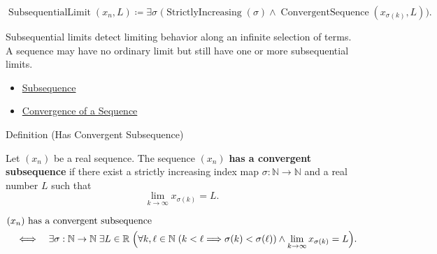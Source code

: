 \begin{remark*}
\[
\operatorname{SubsequentialLimit}(x_n,L)
\coloneqq
\exists \sigma\;
\bigl(
  \operatorname{StrictlyIncreasing}(\sigma)
  \land
  \operatorname{ConvergentSequence}(x_{\sigma(k)},L)
\bigr).
\]
\end{remark*}

\begin{remark*}[Interpretation]
Subsequential limits detect limiting behavior along an infinite selection of
terms. A sequence may have no ordinary limit but still have one or more
subsequential limits.
\end{remark*}

\begin{dependencies}
\begin{itemize}
  \item \hyperref[def:subsequence]{Subsequence}
  \item \hyperref[def:convergent-sequence]{Convergence of a Sequence}
\end{itemize}
\end{dependencies}


\begin{definitionbox}{Definition (Has Convergent Subsequence)}
\begin{definition}
\label{def:has-convergent-subsequence}
Let $(x_n)$ be a real sequence. The sequence $(x_n)$ \textbf{has a
convergent subsequence} if there exist a strictly increasing index map
$\sigma:\mathbb{N}\to\mathbb{N}$ and a real number $L$ such that
\[
  \lim_{k\to\infty}x_{\sigma(k)}=L.
\]
\end{definition}
\end{definitionbox}

\begin{remark*}
\[
\begin{aligned}
&(x_n)\text{ has a convergent subsequence}\\
&\quad\Longleftrightarrow\quad
\exists \sigma:\mathbb{N}\to\mathbb{N}\;\exists L\in\mathbb{R}\;
\Bigl(
  \forall k,\ell\in\mathbb{N}\;(k<\ell\Longrightarrow \sigma(k)<\sigma(\ell))
  \land
  \lim_{k\to\infty}x_{\sigma(k)}=L
\Bigr).
\end{aligned}
\]
\end{remark*}

